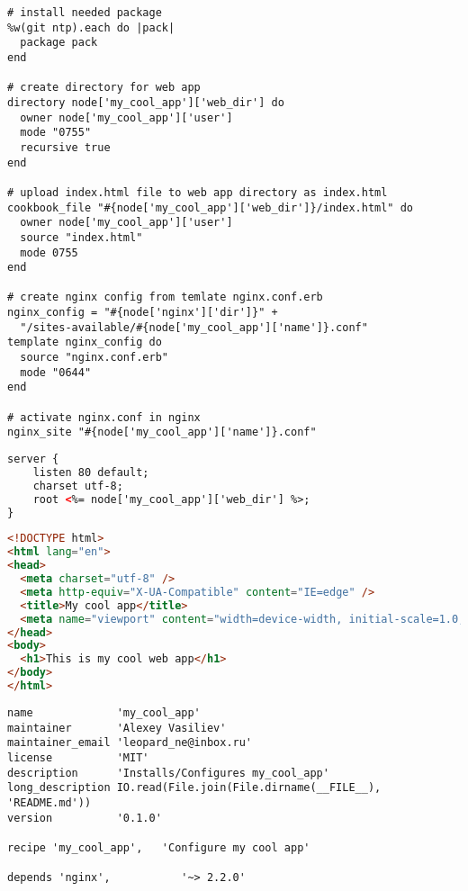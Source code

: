 \begin{lstlisting}[label=lst:cookbook-attributes4,title=my-server-cloud/site-cookbooks/my\_cool\_app/recipes/default.rb]
# install needed package
%w(git ntp).each do |pack|
  package pack
end

# create directory for web app
directory node['my_cool_app']['web_dir'] do
  owner node['my_cool_app']['user']
  mode "0755"
  recursive true
end

# upload index.html file to web app directory as index.html
cookbook_file "#{node['my_cool_app']['web_dir']}/index.html" do
  owner node['my_cool_app']['user']
  source "index.html"
  mode 0755
end

# create nginx config from temlate nginx.conf.erb
nginx_config = "#{node['nginx']['dir']}" +
  "/sites-available/#{node['my_cool_app']['name']}.conf"
template nginx_config do
  source "nginx.conf.erb"
  mode "0644"
end

# activate nginx.conf in nginx
nginx_site "#{node['my_cool_app']['name']}.conf"
\end{lstlisting}

\begin{lstlisting}[language=HTML,label=lst:cookbook-attributes5,title=my-server-cloud/site-cookbooks/my\_cool\_app/templates/default/nginx.conf.erb]
server {
    listen 80 default;
    charset utf-8;
    root <%= node['my_cool_app']['web_dir'] %>;
}
\end{lstlisting}

\begin{lstlisting}[language=HTML,label=lst:cookbook-attributes6,title=my-server-cloud/site-cookbooks/my\_cool\_app/files/default/index.html]
<!DOCTYPE html>
<html lang="en">
<head>
  <meta charset="utf-8" />
  <meta http-equiv="X-UA-Compatible" content="IE=edge" />
  <title>My cool app</title>
  <meta name="viewport" content="width=device-width, initial-scale=1.0, user-scalable=0, maximum-scale=1.0" />
</head>
<body>
  <h1>This is my cool web app</h1>
</body>
</html>
\end{lstlisting}

\begin{lstlisting}[label=lst:cookbook-attributes7,title=my-server-cloud/site-cookbooks/my\_cool\_app/metadata.rb]
name             'my_cool_app'
maintainer       'Alexey Vasiliev'
maintainer_email 'leopard_ne@inbox.ru'
license          'MIT'
description      'Installs/Configures my_cool_app'
long_description IO.read(File.join(File.dirname(__FILE__), 'README.md'))
version          '0.1.0'

recipe 'my_cool_app',   'Configure my cool app'

depends 'nginx',           '~> 2.2.0'
\end{lstlisting}

